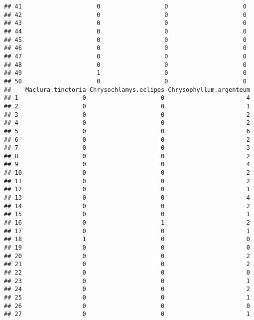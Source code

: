 \documentclass[
]{article}
\begin{document}
\begin{verbatim}
## 41                     0                  0                     0
## 42                     0                  0                     0
## 43                     0                  0                     0
## 44                     0                  0                     0
## 45                     0                  0                     0
## 46                     0                  0                     0
## 47                     0                  0                     0
## 48                     0                  0                     0
## 49                     1                  0                     0
## 50                     0                  0                     0
##    Maclura.tinctoria Chrysochlamys.eclipes Chrysophyllum.argenteum
## 1                  0                     0                       4
## 2                  0                     0                       1
## 3                  0                     0                       2
## 4                  0                     0                       2
## 5                  0                     0                       6
## 6                  0                     0                       2
## 7                  0                     0                       3
## 8                  0                     0                       2
## 9                  0                     0                       4
## 10                 0                     0                       2
## 11                 0                     0                       2
## 12                 0                     0                       1
## 13                 0                     0                       4
## 14                 0                     0                       2
## 15                 0                     0                       1
## 16                 0                     1                       2
## 17                 0                     0                       1
## 18                 1                     0                       0
## 19                 0                     0                       0
## 20                 0                     0                       2
## 21                 0                     0                       2
## 22                 0                     0                       0
## 23                 0                     0                       1
## 24                 0                     0                       2
## 25                 0                     0                       1
## 26                 0                     0                       0
## 27                 0                     0                       1

\end{verbatim}
\end{document}
